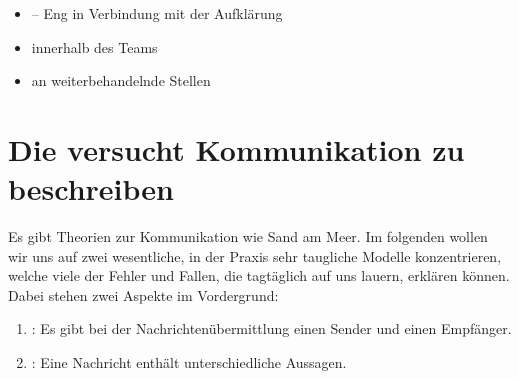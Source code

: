 {\begin{itemize}
  Vor allem ist es aber eine Frage des Respekts  gegenüber
  dem Patienten ihm zu sagen, was man an und mit 
  Körper macht:
  \item {} -- Eng in Verbindung mit
  der Aufklärung
  \item {} innerhalb des Teams
  \item {} an weiterbehandelnde
  Stellen
\end{itemize}
}%


\section{Die  versucht Kommunikation zu beschreiben}

\Text
{{\TxBeschreibung}}%
{%
Es gibt Theorien zur Kommunikation wie Sand am Meer. Im
folgenden wollen wir uns auf zwei wesentliche, in der Praxis
sehr taugliche Modelle konzentrieren, welche viele der
Fehler und Fallen, die tagtäglich auf uns lauern, erklären
können. Dabei stehen zwei Aspekte im Vordergrund:
\begin{enumerate}
  \item {}: Es gibt bei der
  Nachrichtenübermittlung einen Sender und einen Empfänger.
  \item {}: Eine Nachricht enthält
  unterschiedliche Aussagen.
\end{enumerate}
}%


